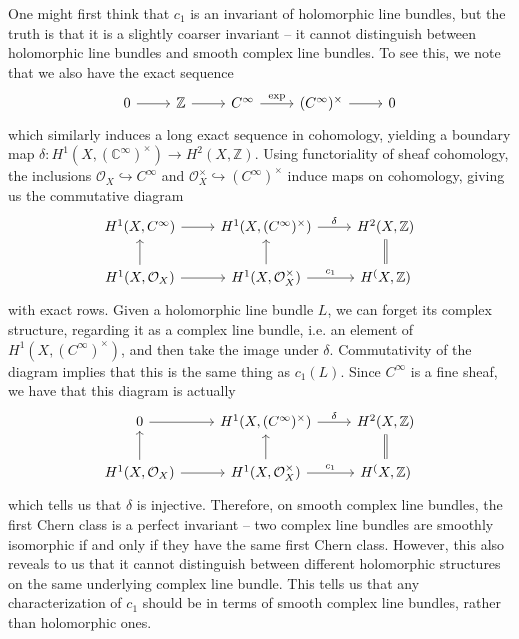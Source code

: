 \documentclass[psamsfonts, 12pt]{amsart}
\theoremstyle{definition}
\theoremstyle{remark}
\renewcommand{\O}{\mathcal{O}}
\newcommand{\Z}{\mathbb{Z}}
\newcommand{\C}{\mathbb{C}}
\begin{document}
One might first think that $c_1$ is an invariant of holomorphic line bundles,
but the truth is that it is a slightly coarser invariant -- it cannot distinguish
between holomorphic line bundles and smooth complex line bundles. To see
this, we note that we also have the exact sequence
\[\begin{tikzcd}
0 \ar[r] & \Z \ar[r] & C^\infty \ar[r, "\mathrm{exp}"] & (C^\infty)^\times \ar[r] & 0
\end{tikzcd}\]
which similarly induces a long exact sequence in cohomology, yielding a boundary
map $\delta : H^1(X, (\C^\infty)^\times) \to H^2(X, \Z)$. Using functoriality
of sheaf cohomology, the inclusions $\O_X \hookrightarrow C^\infty$ and
$\O_X^\times \hookrightarrow (C^\infty)^\times$ induce maps on cohomology, giving
us the commutative diagram
\[\begin{tikzcd}
H^1(X,C^\infty) \ar[r] & H^1(X, (C^\infty)^\times) \ar[r, "\delta"] & H^2(X,\Z) \\
H^1(X, \O_X) \ar[r] \ar[u] & H^1(X, \O_X^\times)
\ar[u] \ar[r, "c_1"] & H^(X, \Z) \ar[u, equal]
\end{tikzcd}\]
with exact rows. Given a holomorphic line bundle $L$, we can forget its complex
structure, regarding it as a complex line bundle, i.e. an element of
$H^1(X, (C^\infty)^\times)$, and then take the image under $\delta$. Commutativity
of the diagram implies that this is the same thing as $c_1(L)$. Since
$C^\infty$ is a fine sheaf, we have that this diagram is actually
\[\begin{tikzcd}
0 \ar[r] & H^1(X, (C^\infty)^\times) \ar[r, "\delta"] & H^2(X,\Z) \\
H^1(X, \O_X) \ar[r] \ar[u] & H^1(X, \O_X^\times)
\ar[u] \ar[r, "c_1"] & H^(X, \Z) \ar[u, equal]
\end{tikzcd}\]
which tells us that $\delta$ is injective. Therefore, on smooth complex line bundles,
the first Chern class is a perfect invariant -- two complex line bundles are smoothly
isomorphic if and only if they have the same first Chern class. However, this also
reveals to us that it cannot distinguish between different holomorphic structures
on the same underlying complex line bundle. This tells us that any characterization
of $c_1$ should be in terms of smooth complex line bundles, rather than holomorphic
ones.
\newpage
%
\nocite{*}
%
\printbibliography
%
\end{document}

